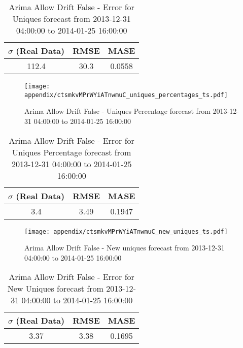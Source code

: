 \begin{table}[H]
\centering
\footnotesize
\begin{tabular}{ccc}
$\sigma$ (Real Data) & RMSE & MASE   \\ \hline
112.4 & 30.3 & 0.0558 \\
\end{tabular}

\vspace{0.5cm}

\caption[]{
Arima Allow Drift False - Error for Uniques forecast from 2013-12-31 04:00:00 to 2014-01-25 16:00:00}
\end{table}

\begin{figure}[H] \begin{center} \leavevmode
\texttt{[image: appendix/ctsmkvMPrWYiATnwmuC\_uniques\_percentages\_ts.pdf]} \caption[]{
Arima Allow Drift False - Uniques Percentage forecast from 2013-12-31 04:00:00 to 2014-01-25 16:00:00} \label{fig:appendix/ctsmkvMPrWYiATnwmuC_uniques_percentages_ts.pdf} \end{center}
\end{figure}

\begin{table}[H]
\centering
\footnotesize
\begin{tabular}{ccc}
$\sigma$ (Real Data) & RMSE & MASE   \\ \hline
3.4 & 3.49 & 0.1947 \\
\end{tabular}

\vspace{0.5cm}

\caption[]{
Arima Allow Drift False - Error for Uniques Percentage forecast from 2013-12-31 04:00:00 to 2014-01-25 16:00:00}
\end{table}

\begin{figure}[H] \begin{center} \leavevmode
\texttt{[image: appendix/ctsmkvMPrWYiATnwmuC\_new\_uniques\_ts.pdf]} \caption[]{
Arima Allow Drift False - New uniques forecast from 2013-12-31 04:00:00 to 2014-01-25 16:00:00} \label{fig:appendix/ctsmkvMPrWYiATnwmuC_new_uniques_ts.pdf} \end{center}
\end{figure}

\begin{table}[H]
\centering
\footnotesize
\begin{tabular}{ccc}
$\sigma$ (Real Data) & RMSE & MASE   \\ \hline
3.37 & 3.38 & 0.1695 \\
\end{tabular}

\vspace{0.5cm}

\caption[]{
Arima Allow Drift False - Error for New Uniques forecast from 2013-12-31 04:00:00 to 2014-01-25 16:00:00}
\end{table}

